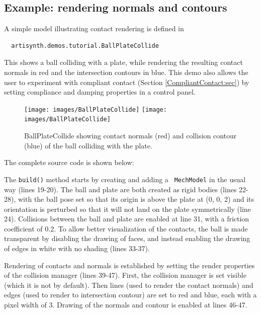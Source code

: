 \subsection{Example: rendering normals and contours}
\label{RenderingContactNormals:sec}

A simple model illustrating contact rendering is defined in
%
\begin{verbatim}
  artisynth.demos.tutorial.BallPlateCollide
\end{verbatim}
%
This shows a ball colliding with a plate, while rendering the
resulting contact normals in red and the intersection contours in
blue. This demo also allows the user to experiment with compliant
contact (Section \ref{CompliantContact:sec}) by setting
{\sf compliance} and {\sf damping} properties in a control panel.

\begin{figure}[ht]
\begin{center}
\iflatexml
 \texttt{[image: images/BallPlateCollide]}
\else
 \texttt{[image: images/BallPlateCollide]}
\fi
\end{center}
\caption{BallPlateCollide showing contact normals (red) and collision contour
(blue) of the ball colliding with the plate.}
\label{BallPlateCollide:fig}
\end{figure}

The complete source code is shown below:
%
\lstset{numbers=left}

\lstset{numbers=none}

The {\tt build()} method starts by creating and adding a {\tt
MechModel} in the usual way (lines 19-20). The ball and plate are both
created as rigid bodies (lines 22-28), with the ball pose set so that
its origin is above the plate at (0, 0, 2) and its orientation is
perturbed so that it will not land on the plate symmetrically (line
24). Collisions between the ball and plate are enabled at line 31, with
a friction coefficient of 0.2. To allow better visualization of the
contacts, the ball is made transparent by disabling the drawing of
faces, and instead enabling the drawing of edges in white with no
shading (lines 33-37).

Rendering of contacts and normals is established by setting the render
properties of the collision manager (lines 39-47). First, the
collision manager is set visible (which it is not by default).  Then
lines (used to render the contact normals) and edges (used to render
to intersection contour) are set to red and blue, each with a pixel
width of 3.  Drawing of the normals and contour is enabled at lines
46-47.

